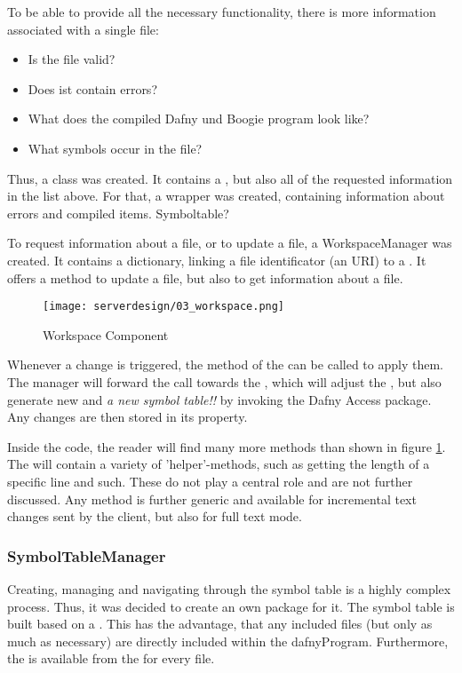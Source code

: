 To be able to provide all the necessary functionality, there is more information associated with a single file:
\begin{itemize}
    \item Is the file valid?
    \item Does ist contain errors?
    \item What does the compiled Dafny und Boogie program look like?
    \item What symbols occur in the file? 
\end{itemize}


Thus, a class  was created. It contains a , but also all of the requested information in the list above. For that, a wrapper  was created, containing information about errors and compiled items. Symboltable?

To request information about a file, or to update a file, a WorkspaceManager was created. It contains a dictionary, linking a file identificator (an URI) to a . It offers a method to update a file, but also to get information about a file.

\begin{figure}[H]
    \centering
    \texttt{[image: serverdesign/03\_workspace.png]}
    \caption{Workspace Component}
    \label{fig:server_workspace}
\end{figure}

Whenever a change is triggered, the  method of the  can be called to apply them. The manager will forward the call towards the , which will adjust the , but also generate new  and \textit{a new symbol table!!} by invoking the Dafny Access package. Any changes are then stored in its  property.

Inside the code, the reader will find many more methods than shown in figure \ref{fig:server_workspace}. The  will contain a variety of 'helper'-methods, such as getting the length of a specific line and such. These do not play a central role and are not further discussed. Any  method is further generic and available for incremental text changes sent by the client, but also for full text mode.

\subsubsection{SymbolTableManager}
Creating, managing and navigating through the symbol table is a highly complex process. Thus, it was decided to create an own package for it. The symbol table is built based on a . This has the advantage, that any included files (but only as much as necessary) are directly included within the dafnyProgram. Furthermore, the  is available from the  for every file.

